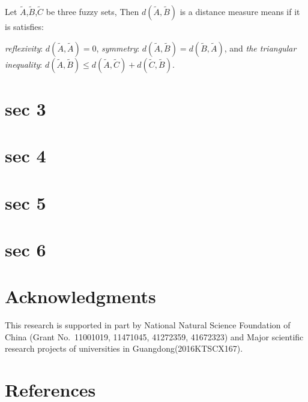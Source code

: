 \documentclass[preprint,12pt,authoryear]{elsarticle}
\begin{document}




Let $\tilde{A}$,$\tilde{B}$,$\tilde{C}$ be three fuzzy sets, Then $d(\tilde{A}, \tilde{B})$ is a distance measure means if it is satisfies:

\textsl{reflexivity}: $d(\tilde{A}, \tilde{A}) = 0$, \textsl{symmetry}: $d(\tilde{A}, \tilde{B}) = d(\tilde{B}, \tilde{A})$, and  \textsl{the triangular inequality}: $d(\tilde{A}, \tilde{B}) \leq d(\tilde{A}, \tilde{C}) + d(\tilde{C}, \tilde{B})$.



\section{sec 3}
\label{sec:3}

\section{sec 4}
\label{sec:4}

\section{sec 5}
\label{sec:5}

\section{sec 6}
\label{sec:6}

\section*{Acknowledgments}
This research is supported in part by National Natural Science Foundation of China (Grant No.~11001019, 11471045, 41272359, 41672323) and Major scientific research projects of universities in Guangdong(2016KTSCX167).



\section*{References}

\end{document}
